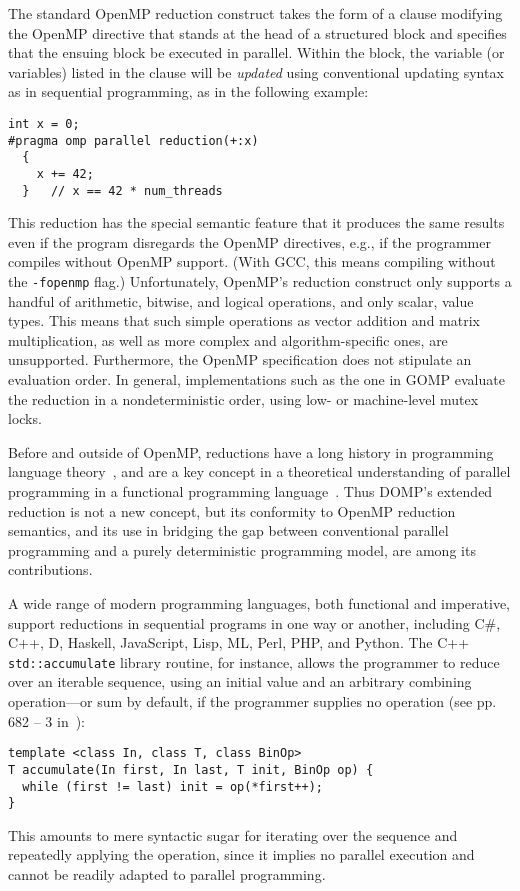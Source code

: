 The standard OpenMP reduction construct takes the form of a clause modifying the OpenMP directive that stands at the head of a structured block and specifies that the ensuing block be executed in parallel.  Within the block, the variable (or variables) listed in the clause will be \textit{updated} using conventional updating syntax as in sequential programming, as in the following example:
%
\begin{verbatim}
int x = 0;
#pragma omp parallel reduction(+:x)
  {
    x += 42;
  }   // x == 42 * num_threads
\end{verbatim}
%
This reduction has the special semantic feature that it produces the same results even if the program disregards the OpenMP directives, e.g., if the programmer compiles without OpenMP support.  (With GCC, this means compiling without the \texttt{-fopenmp} flag.)  Unfortunately, OpenMP's reduction construct only supports a handful of arithmetic, bitwise, and logical operations, and only scalar, value types.   This means that such simple operations as vector addition and matrix multiplication, as well as more complex and algorithm-specific ones, are unsupported.  Furthermore, the OpenMP specification does not stipulate an evaluation order.  In general, implementations such as the one in GOMP evaluate the reduction in a nondeterministic order, using low- or machine-level mutex locks.

Before and outside of OpenMP, reductions have a long history in programming language theory~\cite{iverson62apl}, and are a key concept in a theoretical understanding of parallel programming in a functional programming language~\cite{skillicorn05foundations}.  Thus DOMP's extended reduction is not a new concept, but its conformity to OpenMP reduction semantics, and its use in bridging the gap between conventional parallel programming and a purely deterministic programming model, are among its contributions.

A wide range of modern programming languages, both functional and imperative, support reductions in sequential programs in one way or another, including C\#, C++, D, Haskell, JavaScript, Lisp, ML, Perl, PHP, and Python.  The C++ \texttt{std::accumulate} library routine, for instance, allows the programmer to reduce over an iterable sequence, using an initial value and an arbitrary combining operation---or sum by default, if the programmer supplies no operation (see pp. 682 -- 3 in~\cite{stroustrup97c++}):
\begin{verbatim}
template <class In, class T, class BinOp> 
T accumulate(In first, In last, T init, BinOp op) {
  while (first != last) init = op(*first++);
}
\end{verbatim}
This amounts to mere syntactic sugar for iterating over the sequence and repeatedly applying the operation, since it implies no parallel execution and cannot be readily adapted to parallel programming.

